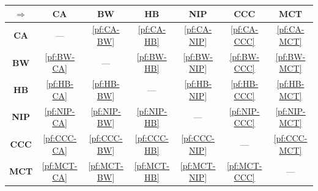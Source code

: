 \begin{center}
\renewcommand{\arraystretch}{1.4}
\begin{tabular}{c|cccccc}
    $\Rightarrow$ & \textbf{CA} & \textbf{BW} & \textbf{HB} & \textbf{NIP} & \textbf{CCC} & \textbf{MCT} \\
    \hline
    \textbf{CA} & --- & \hyperref[pf:CA-BW]{\ref*{pf:CA-BW}} & \hyperref[pf:CA-HB]{\ref*{pf:CA-HB}} & \hyperref[pf:CA-NIP]{\ref*{pf:CA-NIP}} & \hyperref[pf:CA-CCC]{\ref*{pf:CA-CCC}} & \hyperref[pf:CA-MCT]{\ref*{pf:CA-MCT}} \\
    \textbf{BW} & \hyperref[pf:BW-CA]{\ref*{pf:BW-CA}} & --- & \hyperref[pf:BW-HB]{\ref*{pf:BW-HB}} & \hyperref[pf:BW-NIP]{\ref*{pf:BW-NIP}} & \hyperref[pf:BW-CCC]{\ref*{pf:BW-CCC}} & \hyperref[pf:BW-MCT]{\ref*{pf:BW-MCT}} \\
    \textbf{HB} & \hyperref[pf:HB-CA]{\ref*{pf:HB-CA}} & \hyperref[pf:HB-BW]{\ref*{pf:HB-BW}} & --- & \hyperref[pf:HB-NIP]{\ref*{pf:HB-NIP}} & \hyperref[pf:HB-CCC]{\ref*{pf:HB-CCC}} & \hyperref[pf:HB-MCT]{\ref*{pf:HB-MCT}} \\
    \textbf{NIP} & \hyperref[pf:NIP-CA]{\ref*{pf:NIP-CA}} & \hyperref[pf:NIP-BW]{\ref*{pf:NIP-BW}} & \hyperref[pf:NIP-HB]{\ref*{pf:NIP-HB}} & --- & \hyperref[pf:NIP-CCC]{\ref*{pf:NIP-CCC}} & \hyperref[pf:NIP-MCT]{\ref*{pf:NIP-MCT}} \\
    \textbf{CCC} & \hyperref[pf:CCC-CA]{\ref*{pf:CCC-CA}} & \hyperref[pf:CCC-BW]{\ref*{pf:CCC-BW}} & \hyperref[pf:CCC-HB]{\ref*{pf:CCC-HB}} & \hyperref[pf:CCC-NIP]{\ref*{pf:CCC-NIP}} & --- & \hyperref[pf:CCC-MCT]{\ref*{pf:CCC-MCT}} \\
    \textbf{MCT} & \hyperref[pf:MCT-CA]{\ref*{pf:MCT-CA}} & \hyperref[pf:MCT-BW]{\ref*{pf:MCT-BW}} & \hyperref[pf:MCT-HB]{\ref*{pf:MCT-HB}} & \hyperref[pf:MCT-NIP]{\ref*{pf:MCT-NIP}} & \hyperref[pf:MCT-CCC]{\ref*{pf:MCT-CCC}} & --- \\
\end{tabular}
\end{center}




